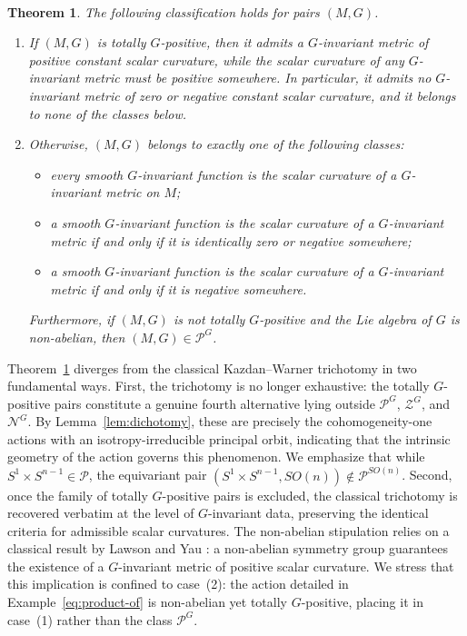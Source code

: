 \documentclass[12pt,a4paper]{amsart}
\theoremstyle{plain}
\newtheorem{theorem}{Theorem}[section]
\theoremstyle{definition}
\theoremstyle{remark}
\begin{document}
\ 

\begin{theorem}\label{ithm:main}
The following classification holds for pairs $(M,G)$.
\begin{enumerate}
\item If $(M,G)$ is totally $G$-positive, then it admits a $G$-invariant metric of positive constant scalar curvature, while the scalar curvature of any $G$-invariant metric must be positive somewhere. In particular, it admits no $G$-invariant metric of zero or negative constant scalar curvature, and it belongs to none of the classes below.
\item Otherwise, $(M,G)$ belongs to exactly one of the following classes:
\begin{itemize}
\item[\textup{(}$\mathscr{P}^G$\textup{)}] every smooth $G$-invariant function is the scalar curvature of a $G$-invariant metric on $M$;
\item[\textup{(}$\mathscr{Z}^G$\textup{)}] a smooth $G$-invariant function is the scalar curvature of a $G$-invariant metric if and only if it is identically zero or negative somewhere;
\item[\textup{(}$\mathscr{N}^G$\textup{)}] a smooth $G$-invariant function is the scalar curvature of a $G$-invariant metric if and only if it is negative somewhere.
\end{itemize}
Furthermore, if $(M, G)$ is not totally $G$-positive and the Lie algebra of $G$ is non-abelian, then $(M, G) \in \mathscr{P}^G$.
\end{enumerate}
\end{theorem}

Theorem~\ref{ithm:main} diverges from the classical Kazdan--Warner trichotomy in two fundamental ways. First, the trichotomy is no longer exhaustive: the totally $G$-positive pairs constitute a genuine fourth alternative lying outside $\mathscr{P}^G$, $\mathscr{Z}^G$, and $\mathscr{N}^G$. By Lemma~\ref{lem:dichotomy}, these are precisely the cohomogeneity-one actions with an isotropy-irreducible principal orbit, indicating that the intrinsic geometry of the action governs this phenomenon. We emphasize that while $S^1 \times S^{n-1} \in \mathscr{P}$, the equivariant pair $(S^1 \times S^{n-1}, SO(n)) \notin \mathscr{P}^{SO(n)}$. Second, once the family of totally $G$-positive pairs is excluded, the classical trichotomy is recovered verbatim at the level of $G$-invariant data, preserving the identical criteria for admissible scalar curvatures. The non-abelian stipulation relies on a classical result by Lawson and Yau \cite{lawson-yau}: a non-abelian symmetry group guarantees the existence of a $G$-invariant metric of positive scalar curvature. We stress that this implication is confined to case~(2): the action detailed in Example~\ref{eq:product-of} is non-abelian yet totally $G$-positive, placing it in case~(1) rather than the class $\mathscr{P}^G$. 
\end{document}
